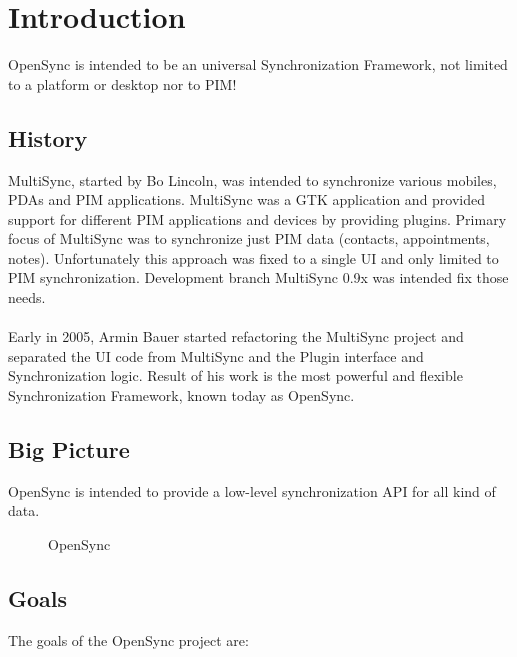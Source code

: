 \chapter{Introduction}
\label{chap:intro}
OpenSync is intended to be an universal Synchronization Framework, not limited to
a platform or desktop nor to PIM!

\section{History}
MultiSync, started by Bo Lincoln, was intended to synchronize various mobiles,
PDAs and PIM applications. MultiSync was a GTK application and provided
support for different PIM applications and devices by providing  plugins.
Primary focus of MultiSync was to synchronize just PIM data (contacts, 
appointments, notes). Unfortunately this approach was fixed to a single UI and 
only limited to PIM synchronization. Development branch MultiSync 0.9x was 
intended fix those needs.\\
\\
Early in 2005, Armin Bauer started refactoring the MultiSync project and
separated the UI code from MultiSync and the Plugin interface and
Synchronization logic. Result of his work is the most powerful and
flexible Synchronization Framework, known today as OpenSync.
\section{Big Picture}
OpenSync is intended to provide a low-level synchronization API for all kind of 
data.
\\
\begin{figure}
 \centering
 \caption{OpenSync}
 \label{fig:bigpicture}
\end{figure}


\section{Goals}
The goals of the OpenSync project are:

